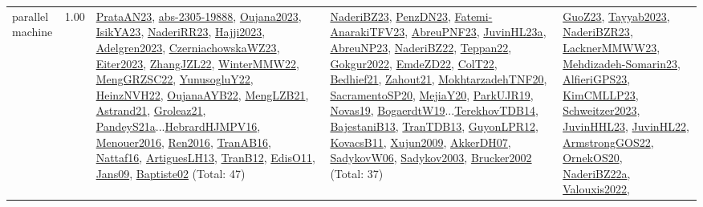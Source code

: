 {\begin{longtable}{p{3cm}r>{\raggedright\arraybackslash}p{6cm}>{\raggedright\arraybackslash}p{6cm}>{\raggedright\arraybackslash}p{8cm}}
\index{parallel machine}\index{Classification!parallel machine}parallel machine &  1.00 & \hyperref[detail:PrataAN23]{PrataAN23}, \hyperref[detail:abs-2305-19888]{abs-2305-19888}, \hyperref[detail:Oujana2023]{Oujana2023}, \hyperref[detail:IsikYA23]{IsikYA23}, \hyperref[detail:NaderiRR23]{NaderiRR23}, \hyperref[detail:Hajji2023]{Hajji2023}, \hyperref[detail:Adelgren2023]{Adelgren2023}, \hyperref[detail:CzerniachowskaWZ23]{CzerniachowskaWZ23}, \hyperref[detail:Eiter2023]{Eiter2023}, \hyperref[detail:ZhangJZL22]{ZhangJZL22}, \hyperref[detail:WinterMMW22]{WinterMMW22}, \hyperref[detail:MengGRZSC22]{MengGRZSC22}, \hyperref[detail:YunusogluY22]{YunusogluY22}, \hyperref[detail:HeinzNVH22]{HeinzNVH22}, \hyperref[detail:OujanaAYB22]{OujanaAYB22}, \hyperref[detail:MengLZB21]{MengLZB21}, \hyperref[detail:Astrand21]{Astrand21}, \hyperref[detail:Groleaz21]{Groleaz21}, \hyperref[detail:PandeyS21a]{PandeyS21a}...\hyperref[detail:HebrardHJMPV16]{HebrardHJMPV16}, \hyperref[detail:Menouer2016]{Menouer2016}, \hyperref[detail:Ren2016]{Ren2016}, \hyperref[detail:TranAB16]{TranAB16}, \hyperref[detail:Nattaf16]{Nattaf16}, \hyperref[detail:ArtiguesLH13]{ArtiguesLH13}, \hyperref[detail:TranB12]{TranB12}, \hyperref[detail:EdisO11]{EdisO11}, \hyperref[detail:Jans09]{Jans09}, \hyperref[detail:Baptiste02]{Baptiste02} (Total: 47) & \hyperref[detail:NaderiBZ23]{NaderiBZ23}, \hyperref[detail:PenzDN23]{PenzDN23}, \hyperref[detail:Fatemi-AnarakiTFV23]{Fatemi-AnarakiTFV23}, \hyperref[detail:AbreuPNF23]{AbreuPNF23}, \hyperref[detail:JuvinHL23a]{JuvinHL23a}, \hyperref[detail:AbreuNP23]{AbreuNP23}, \hyperref[detail:NaderiBZ22]{NaderiBZ22}, \hyperref[detail:Teppan22]{Teppan22}, \hyperref[detail:Gokgur2022]{Gokgur2022}, \hyperref[detail:EmdeZD22]{EmdeZD22}, \hyperref[detail:ColT22]{ColT22}, \hyperref[detail:Bedhief21]{Bedhief21}, \hyperref[detail:Zahout21]{Zahout21}, \hyperref[detail:MokhtarzadehTNF20]{MokhtarzadehTNF20}, \hyperref[detail:SacramentoSP20]{SacramentoSP20}, \hyperref[detail:MejiaY20]{MejiaY20}, \hyperref[detail:ParkUJR19]{ParkUJR19}, \hyperref[detail:Novas19]{Novas19}, \hyperref[detail:BogaerdtW19]{BogaerdtW19}...\hyperref[detail:TerekhovTDB14]{TerekhovTDB14}, \hyperref[detail:BajestaniB13]{BajestaniB13}, \hyperref[detail:TranTDB13]{TranTDB13}, \hyperref[detail:GuyonLPR12]{GuyonLPR12}, \hyperref[detail:KovacsB11]{KovacsB11}, \hyperref[detail:Xujun2009]{Xujun2009}, \hyperref[detail:AkkerDH07]{AkkerDH07}, \hyperref[detail:SadykovW06]{SadykovW06}, \hyperref[detail:Sadykov2003]{Sadykov2003}, \hyperref[detail:Brucker2002]{Brucker2002} (Total: 37) & \hyperref[detail:GuoZ23]{GuoZ23}, \hyperref[detail:Tayyab2023]{Tayyab2023}, \hyperref[detail:NaderiBZR23]{NaderiBZR23}, \hyperref[detail:LacknerMMWW23]{LacknerMMWW23}, \hyperref[detail:Mehdizadeh-Somarin23]{Mehdizadeh-Somarin23}, \hyperref[detail:AlfieriGPS23]{AlfieriGPS23}, \hyperref[detail:KimCMLLP23]{KimCMLLP23}, \hyperref[detail:Schweitzer2023]{Schweitzer2023}, \hyperref[detail:JuvinHHL23]{JuvinHHL23}, \hyperref[detail:JuvinHL22]{JuvinHL22}, \hyperref[detail:ArmstrongGOS22]{ArmstrongGOS22}, \hyperref[detail:OrnekOS20]{OrnekOS20}, \hyperref[detail:NaderiBZ22a]{NaderiBZ22a}, \hyperref[detail:Valouxis2022]{Valouxis2022}, 
\end{longtable}}
